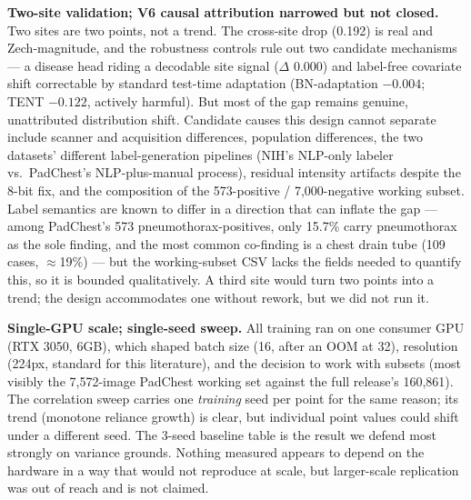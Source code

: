 \documentclass{ieeeaccess}
\begin{document}
\textbf{Two-site validation; V6 causal attribution narrowed but not closed.} Two sites are two points, not a trend. The cross-site drop (0.192) is real and Zech-magnitude, and the robustness controls rule out two candidate mechanisms --- a disease head riding a decodable site signal ($\Delta$ 0.000) and label-free covariate shift correctable by standard test-time adaptation (BN-adaptation $-0.004$; TENT $-0.122$, actively harmful). But most of the gap remains genuine, unattributed distribution shift. Candidate causes this design cannot separate include scanner and acquisition differences, population differences, the two datasets' different label-generation pipelines (NIH's NLP-only labeler vs.\ PadChest's NLP-plus-manual process), residual intensity artifacts despite the 8-bit fix, and the composition of the 573-positive / 7,000-negative working subset. Label semantics are known to differ in a direction that can inflate the gap --- among PadChest's 573 pneumothorax-positives, only 15.7\% carry pneumothorax as the sole finding, and the most common co-finding is a chest drain tube (109 cases, $\approx$19\%) --- but the working-subset CSV lacks the fields needed to quantify this, so it is bounded qualitatively. A third site would turn two points into a trend; the design accommodates one without rework, but we did not run it.

\textbf{Single-GPU scale; single-seed sweep.} All training ran on one consumer GPU (RTX 3050, 6GB), which shaped batch size (16, after an OOM at 32), resolution (224px, standard for this literature), and the decision to work with subsets (most visibly the 7,572-image PadChest working set against the full release's 160,861). The correlation sweep carries one \emph{training} seed per point for the same reason; its trend (monotone reliance growth) is clear, but individual point values could shift under a different seed. The 3-seed baseline table is the result we defend most strongly on variance grounds. Nothing measured appears to depend on the hardware in a way that would not reproduce at scale, but larger-scale replication was out of reach and is not claimed.
\end{document}
